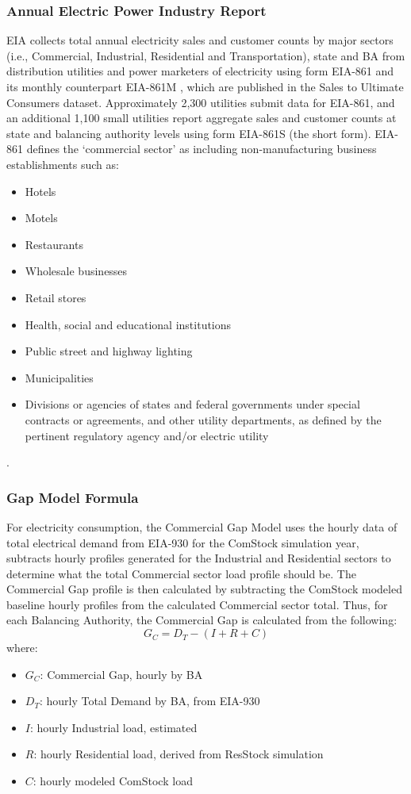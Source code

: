 \subsubsection{Annual Electric Power Industry Report}
EIA collects total annual electricity sales and customer counts by major sectors (i.e., Commercial, Industrial, Residential and Transportation), state and BA from distribution utilities and power marketers of electricity using form EIA-861 \citep{eia861} and its monthly counterpart EIA-861M \citep{eia861m}, which are published in the Sales to Ultimate Consumers dataset. Approximately 2,300 utilities submit data for EIA-861, and an additional 1,100 small utilities report aggregate sales and customer counts at state and balancing authority levels using form EIA-861S (the short form). EIA-861 defines the ‘commercial sector’ as including non-manufacturing business establishments such as:
\begin{itemize}
    \item Hotels
    \item Motels
    \item Restaurants
    \item Wholesale businesses
    \item Retail stores
    \item Health, social and educational institutions
    \item Public street and highway lighting
    \item Municipalities
    \item Divisions or agencies of states and federal governments under special contracts or agreements, and other utility departments, as defined by the pertinent regulatory agency and/or electric utility
\end{itemize} \citep{eia861_instructions}.

\subsubsection{Gap Model Formula}
For electricity consumption, the Commercial Gap Model uses the hourly data of total electrical demand from EIA-930 for the ComStock simulation year, subtracts hourly profiles generated for the Industrial and Residential sectors to determine what the total Commercial sector load profile should be. The Commercial Gap profile is then calculated by subtracting the ComStock modeled baseline hourly profiles from the calculated Commercial sector total. Thus, for each Balancing Authority, the Commercial Gap is calculated from the following:
\begin{equation}
G_{C} = D_{T} - (I + R + C)
\end{equation}
where:
\begin{itemize}
    \item $G_{C}$: Commercial Gap, hourly by BA
    \item $D_{T}$: hourly Total Demand by BA, from EIA-930
    \item $I$: hourly Industrial load, estimated
    \item $R$: hourly Residential load, derived from ResStock simulation
    \item $C$: hourly modeled ComStock load
\end{itemize}

